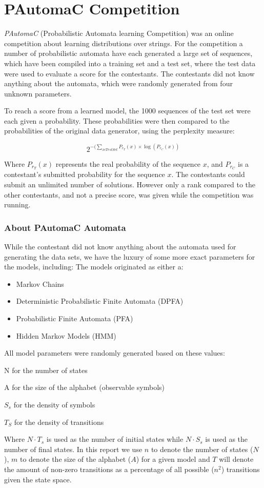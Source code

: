 \section{PAutomaC Competition}
\label{sec:pautomac}
\emph{PAutomaC} (Probabilistic Automata learning Competition) was an online competition about learning distributions over strings. For the competition a number of probabilistic automata have each generated a large set of sequences, which have been compiled into a training set and a test set, where the test data were used to evaluate a score for the contestants.
The contestants did not know anything about the automata, which were randomly generated from four unknown parameters.

To reach a score from a learned model, the 1000 sequences of the test set were each given a probability. These probabilities were then compared to the probabilities of the original data generator, using the perplexity measure:

\begin{equation} \label{eq:perplexity}
2^{-(\sum_{x\epsilon TestSet}P_{r_{T}}(x)\times\log(P_{r_{C}}(x))}
\end{equation}

Where $P_{r_{T}}(x)$ represents the real probability of the
sequence $x$, and $P_{r_{C}}$ is a contestant's submitted probability for the sequence $x$.
The contestants could submit an unlimited number of solutions. However only a rank compared to the other contestants, and not a precise score, was given while the competition was running.

\subsubsection{About PAutomaC Automata}
While the contestant did not know anything about the automata used for generating the data sets, we have the luxury of some more exact parameters for the models, including:
The models originated as either a:
\begin{itemize}
\item Markov Chains
\item Deterministic Probabilistic Finite Automata (DPFA)
\item Probabilistic Finite Automata (PFA)
\item Hidden Markov Models (HMM)
\end{itemize}
All model parameters were randomly generated based on these values:
\begin{description}
\item N for the number of states
\item A for the size of the alphabet (observable symbols)
\item $S_s$ for the density of symbols
\item $T_S$ for the density of transitions
\end{description}
Where $N \cdot T_s$ is used as the number of initial states while $N \cdot S_s$ is used as the number of final states. In this report we use $n$ to denote the number of states ($N$), $m$ to denote the size of the alphabet ($A$) for a given model and $T$ will denote the amount of non-zero transitions as a percentage of all possible ($n^2$) transitions given the state space.

